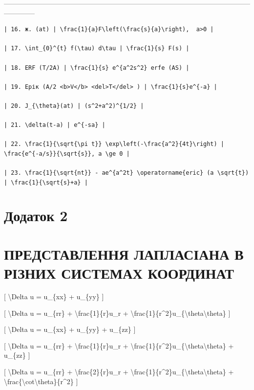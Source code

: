 \documentclass[
]{article}
\begin{document}
{\textbar------------------------------------------------------------------------\textbar--------------------------------------------------\textbar{}

\begin{verbatim}
| 16. ж. (at) | \frac{1}{a}F\left(\frac{s}{a}\right),  a>0 |

| 17. \int_{0}^{t} f(\tau) d\tau | \frac{1}{s} F(s) |

| 18. ERF (T/2A) | \frac{1}{s} e^{a^2s^2} erfe (AS) |

| 19. Ерік (A/2 <b>V</b> <del>T</del> ) | \frac{1}{s}e^{-a} |

| 20. J_{\theta}(at) | (s^2+a^2)^{1/2} |

| 21. \delta(t-a) | e^{-sa} |

| 22. \frac{1}{\sqrt{\pi t}} \exp\left(-\frac{a^2}{4t}\right) | \frac{e^{-a/s}}{\sqrt{s}}, a \ge 0 |

| 23. \frac{1}{\sqrt{nt}} - ae^{a^2t} \operatorname{eric} (a \sqrt{t}) | \frac{1}{\sqrt{s}+a} |
\end{verbatim}

\section{Додаток 2}\label{ux434ux43eux434ux430ux442ux43eux43a-2}

\section{ПРЕДСТАВЛЕННЯ ЛАПЛАСІАНА В РІЗНИХ СИСТЕМАХ
КООРДИНАТ}\label{ux43fux440ux435ux434ux441ux442ux430ux432ux43bux435ux43dux43dux44f-ux43bux430ux43fux43bux430ux441ux456ux430ux43dux430-ux432-ux440ux456ux437ux43dux438ux445-ux441ux438ux441ux442ux435ux43cux430ux445-ux43aux43eux43eux440ux434ux438ux43dux430ux442}

{[} \textbackslash Delta u = u\_\{xx\} + u\_\{yy\} {]}

{[} \textbackslash Delta u = u\_\{rr\} +
\textbackslash frac\{1\}\{r\}u\_r +
\textbackslash frac\{1\}\{r\^{}2\}u\_\{\textbackslash theta\textbackslash theta\}
{]}

{[} \textbackslash Delta u = u\_\{xx\} + u\_\{yy\} + u\_\{zz\} {]}

{[} \textbackslash Delta u = u\_\{rr\} +
\textbackslash frac\{1\}\{r\}u\_r +
\textbackslash frac\{1\}\{r\^{}2\}u\_\{\textbackslash theta\textbackslash theta\}
+ u\_\{zz\} {]}

{[} \textbackslash Delta u = u\_\{rr\} +
\textbackslash frac\{2\}\{r\}u\_r +
\textbackslash frac\{1\}\{r\^{}2\}u\_\{\textbackslash theta\textbackslash theta\}
+
\textbackslash frac\{\textbackslash cot\textbackslash theta\}\{r\^{}2\}
{]}

}
\end{document}
